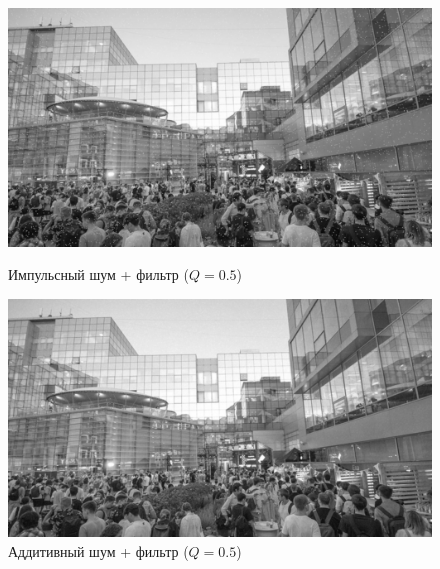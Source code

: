 \documentclass[a4paper]{article}
\begin{document}
\begin{figure}[H]
    \begin{minipage}{0.49\textwidth}
        \centering \includegraphics[width=\textwidth]{images/2_low_filters/impulse - contrharmonic (Q=0.5).jpg}
        \caption{Импульсный шум + фильтр ($Q = 0.5$)}
    \end{minipage}\hfill
    \begin{minipage}{0.49\textwidth}
        \centering \includegraphics[width=\textwidth]{images/2_low_filters/additive - contrharmonic (Q=0.5).jpg}
        \caption{Аддитивный шум + фильтр ($Q = 0.5$)}
    \end{minipage}
\end{figure}
\end{document}
